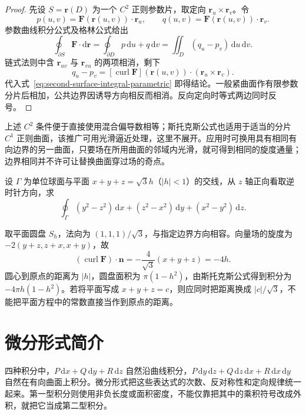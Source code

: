 \documentclass[UTF8,12pt,a4paper,fontset=fandol]{ctexbook}
\begin{document}
\begin{proof}
先设 $S=\boldsymbol r(D)$ 为一个 $C^2$ 正则参数片，取定向 $\boldsymbol r_u\times\boldsymbol r_v$。令
\[
    p(u,v)=\boldsymbol F(\boldsymbol r(u,v))\cdot\boldsymbol r_u,
    \qquad q(u,v)=\boldsymbol F(\boldsymbol r(u,v))\cdot\boldsymbol r_v.
\]
参数曲线积分公式及格林公式给出
\[
    \oint_{\partial S}\boldsymbol F\cdot\mathrm d\boldsymbol r
    =\oint_{\partial D}p\,\mathrm du+q\,\mathrm dv
    =\iint_D(q_u-p_v)\,\mathrm du\,\mathrm dv.
\]
链式法则中含 $\boldsymbol r_{uv}$ 与 $\boldsymbol r_{vu}$ 的两项相消，剩下
\[
    q_u-p_v
    =[\operatorname{curl}\boldsymbol F](\boldsymbol r(u,v))
      \cdot(\boldsymbol r_u\times\boldsymbol r_v).
\]
代入式~\eqref{eq:second-surface-integral-parametric} 即得结论。一般紧曲面作有限参数分片后相加，公共边界因诱导方向相反而相消。反向定向时等式两边同时反号。
\end{proof}

上述 $C^2$ 条件便于直接使用混合偏导数相等；斯托克斯公式也适用于适当的分片 $C^1$ 正则曲面，该推广可用光滑逼近处理，这里不展开。应用时可换用具有相同有向边界的另一曲面，只要场在所用曲面的邻域内光滑，就可得到相同的旋度通量；边界相同并不许可让替换曲面穿过场的奇点。

\begin{example}
\label{ex:stokes-sphere-plane-circle}
设 $\Gamma$ 为单位球面与平面 $x+y+z=\sqrt3h$（$|h|<1$）的交线，从 $z$ 轴正向看取逆时针方向，求
\[
    \oint_\Gamma(y^2-z^2)\,\mathrm dx+(z^2-x^2)\,\mathrm dy+(x^2-y^2)\,\mathrm dz.
\]
\end{example}
\begin{solve}
取平面圆盘 $S_h$，法向为 $(1,1,1)/\sqrt3$，与指定边界方向相容。向量场的旋度为 $-2(y+z,z+x,x+y)$，故
\[
    (\operatorname{curl}\boldsymbol F)\cdot\boldsymbol n
    =-\frac4{\sqrt3}(x+y+z)=-4h.
\]
圆心到原点的距离为 $|h|$，圆盘面积为 $\pi(1-h^2)$，由斯托克斯公式得到积分为 $-4\pi h(1-h^2)$。若将平面写成 $x+y+z=c$，则应同时把距离换成 $|c|/\sqrt3$，不能把平面方程中的常数直接当作到原点的距离。
\end{solve}

\section{微分形式简介}
\label{sec:introduction-to-differential-forms}

四种积分中，$P\,\mathrm dx+Q\,\mathrm dy+R\,\mathrm dz$ 自然沿曲线积分，$P\,\mathrm dy\,\mathrm dz+Q\,\mathrm dz\,\mathrm dx+R\,\mathrm dx\,\mathrm dy$ 自然在有向曲面上积分。微分形式把这些表达式的次数、反对称性和定向规律统一起来。第一型积分则使用非负长度或面积密度，不能仅靠把其中的乘积符号改成外积，就把它当成第二型积分。
\end{document}
